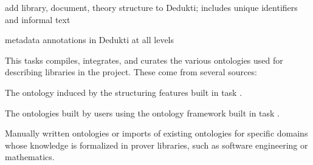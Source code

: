 \begin{workpackage}
\begin{tasklist}
\begin{task}[id=strlibstructure,title=Library Structure,lead=Fau,FauRM=12]
add library, document, theory structure to Dedukti; includes unique identifiers and informal text

%
%
\end{task} 

\begin{task}[id=strdofimpl,title=Ontological Framework for Meta-Data,lead=Sac,SacRM=18]
metadata annotations in Dedukti at all levels
\end{task} 

\begin{task}[id=strrefonto,title=Reference Ontology,lead=Fau,FauRM=6,SacRM=6]
This tasks compiles, integrates, and curates the various ontologies used for describing libraries in the project.
These come from several sources:
\begin{compactitem}
 \item The ontology induced by the structuring features built in task .
 \item The ontologies built by users using the ontology framework built in task .
 \item Manually written ontologies or imports of existing ontologies for specific domains whose knowledge is formalized in prover libraries, such as software engineering or mathematics.
\end{compactitem}
\end{task} 


\end{tasklist}
\end{workpackage}
